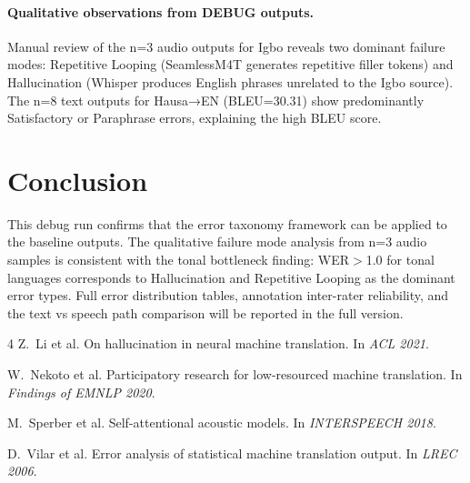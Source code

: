 \documentclass[11pt,a4paper]{article}
\begin{document}
\paragraph{Qualitative observations from DEBUG outputs.}
Manual review of the n=3 audio outputs for Igbo reveals two dominant failure modes: Repetitive Looping (SeamlessM4T generates repetitive filler tokens) and Hallucination (Whisper produces English phrases unrelated to the Igbo source). The n=8 text outputs for Hausa→EN (BLEU=30.31) show predominantly Satisfactory or Paraphrase errors, explaining the high BLEU score.

\section{Conclusion}
\label{sec:conclusion}

This debug run confirms that the error taxonomy framework can be applied to the baseline outputs. The qualitative failure mode analysis from n=3 audio samples is consistent with the tonal bottleneck finding: WER$>$1.0 for tonal languages corresponds to Hallucination and Repetitive Looping as the dominant error types. Full error distribution tables, annotation inter-rater reliability, and the text vs speech path comparison will be reported in the full version.




\begin{thebibliography}{4}
Z.~Li et al.
\newblock On hallucination in neural machine translation.
\newblock In \emph{ACL 2021}.

W.~Nekoto et al.
\newblock Participatory research for low-resourced machine translation.
\newblock In \emph{Findings of EMNLP 2020}.

M.~Sperber et al.
\newblock Self-attentional acoustic models.
\newblock In \emph{INTERSPEECH 2018}.

D.~Vilar et al.
\newblock Error analysis of statistical machine translation output.
\newblock In \emph{LREC 2006}.
\end{thebibliography}
\end{document}
